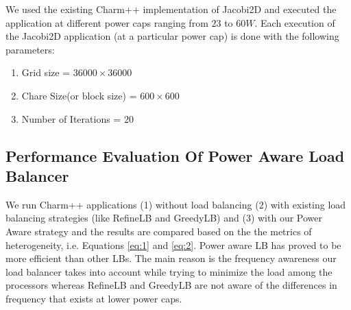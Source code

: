 We used the existing Charm++ implementation of Jacobi2D and executed the
application at different power caps ranging from $23$ to $60 W$.  Each
execution of the Jacobi2D application (at a particular power cap) is done with
the following parameters:

\begin{enumerate}
\item Grid size                   = $ 36000 \times 36000$
\item Chare Size(or block size)   = $600 \times 600$
\item Number of Iterations        = $20$
\end{enumerate}

\subsection{Performance Evaluation Of Power Aware Load Balancer}
We run Charm++ applications (1) without load balancing (2) with existing load
balancing strategies (like  RefineLB and GreedyLB) and (3) with our Power Aware
strategy and the results are compared based on the the metrics of
heterogeneity, i.e. Equations \eqref{eq:1} and \eqref{eq:2}.  Power aware LB
has proved to be more efficient than other LBs. The main reason is the
frequency awareness our load balancer takes into account while trying to
minimize the load among the processors whereas RefineLB and GreedyLB are not aware of the
differences in frequency that exists at lower power caps. 


